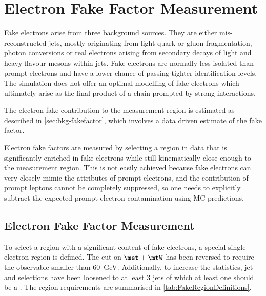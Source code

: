 \section{Electron Fake Factor Measurement}%
\label{sec:bkg-fakes-electron}

Fake electrons arise from three background sources. They are either
mis-reconstructed jets, mostly originating from light quark or gluon
fragmentation, photon conversions or real electrons arising from secondary
decays of light and heavy flavour mesons within jets. Fake electrons are
normally less isolated than prompt electrons and have a lower chance of passing
tighter identification levels. The simulation does not offer an optimal
modelling of fake electrons which ultimately arise as the final product of
a chain prompted by strong interactions.

The electron fake contribution to the measurement region is estimated as described
in \cref{sec:bkg-fakefactor}, which involves a data driven estimate of
the fake factor.

Electron fake factors are measured by selecting a region in data that
is significantly enriched in fake electrons while still kinematically close
enough to the measurement region. This is not easily achieved because fake electrons
can very closely mimic the attributes of prompt electrons, and the contribution
of prompt leptons cannot be completely suppressed, so one needs to explicitly
subtract the expected prompt electron contamination using MC predictions.


\subsection{Electron Fake Factor Measurement}

To select a region with a significant content of fake electrons, a special
single electron region is defined. The cut on \( \met + \mtW \) has been
reversed to require the observable smaller than \qty{60}{\GeV}. Additionally,
to increase the statistics, jet and \bjet selections have been loosened
to at least 3 jets of which at least one should be a \bjet. The region requirements
are summarised in \cref{tab:FakeRegionDefinitions}.

